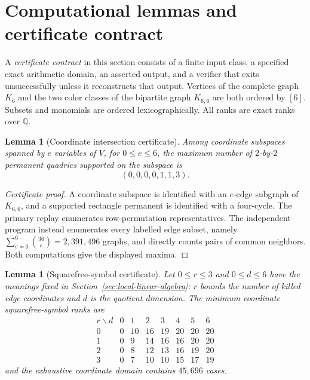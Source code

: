 \documentclass[11pt]{amsart}
\newcommand{\Q}{\mathbb{Q}}
\newtheorem{lemma}[theorem]{Lemma}
\theoremstyle{definition}
\begin{document}
\section{Computational lemmas and certificate contract}
\label{sec:certificates}

A \emph{certificate contract} in this section consists of a finite input
class, a specified exact arithmetic domain, an asserted output, and a verifier
that exits unsuccessfully unless it reconstructs that output. Vertices of the
complete graph \(K_6\) and the two color classes of the bipartite graph
\(K_{6,6}\) are both ordered by \([6]\). Subsets and monomials are ordered
lexicographically. All ranks are exact ranks over \(\Q\).

\begin{lemma}[Coordinate intersection certificate]
\label{lem:certificate-intersection}
Among coordinate subspaces spanned by \(e\) variables of \(V\), for
\(0\le e\le6\), the maximum number of \(2\)-by-\(2\) permanent quadrics
supported on the subspace is
\[
 (0,0,0,0,1,1,3).
\]
\end{lemma}

\begin{proof}[Certificate proof]
A coordinate subspace is identified with an \(e\)-edge subgraph of
\(K_{6,6}\), and a supported rectangle permanent is identified with a
four-cycle. The primary replay enumerates row-permutation representatives.
The independent program 
instead enumerates every labelled edge subset, namely
\(\sum_{e=0}^6\binom{36}{e}=2{,}391{,}496\) graphs, and directly counts pairs
of common neighbors. Both computations give the displayed maxima.
\end{proof}

\begin{lemma}[Squarefree-symbol certificate]
\label{lem:certificate-squarefree}
Let \(0\le r\le3\) and \(0\le d\le6\) have the meanings fixed in
Section~\ref{sec:local-linear-algebra}: \(r\) bounds the number of killed edge
coordinates and \(d\) is the quotient dimension. The minimum coordinate
squarefree-symbol ranks are
\[
\begin{array}{c|rrrrrrr}
r\backslash d&0&1&2&3&4&5&6\\ \hline
0&0&10&16&19&20&20&20\\
1&0&9&14&16&16&20&20\\
2&0&8&12&13&16&19&20\\
3&0&7&10&10&15&17&19
\end{array}
\]
and the exhaustive coordinate domain contains \(45{,}696\) cases.
\end{lemma}
\end{document}
